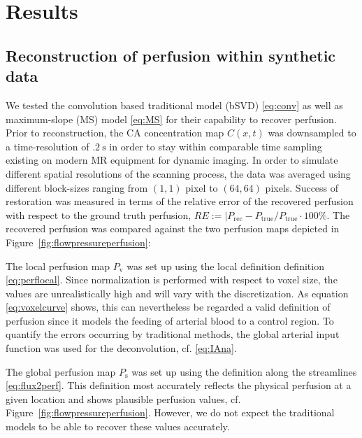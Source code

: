 \documentclass[journal,twocolumn]{IEEEtran}
\newcommand{\Perf}{P}
\newcommand{\Perfv}{P_{\mathrm{v}}}
\newcommand{\Perfs}{P_{\mathrm{s}}}
\begin{document}
	\section{Results}	
	\subsection{Reconstruction of perfusion within synthetic data}\label{sec:RecPhantom}


	We tested the convolution based traditional model (bSVD) \eqref{eq:conv} as well as maximum-slope (MS) model \eqref{eq:MS} for their capability to recover perfusion.
	Prior to reconstruction, the CA concentration map $C(x,t)$ was downsampled to a time-resolution of $\SI{.2}{\second}$ in order to stay within comparable time sampling existing on modern MR equipment for dynamic imaging.
	In order to simulate different spatial resolutions of the scanning process, the data was averaged using different block-sizes ranging from $(1,1)$ pixel to $(64,64)$ pixels.		
	Success of restoration was measured in terms of the relative error of the recovered perfusion with respect to the ground truth perfusion, $RE := \vert \Perf_{\mathrm{rec}} - \Perf_{\mathrm{true}}/\Perf_{\mathrm{true}}\cdot 100\%$.
	The recovered perfusion was compared against the two perfusion maps depicted in Figure~\ref{fig:flowpressureperfusion}:
	
	The local perfusion map $\Perfv$ was set up using the local definition definition \eqref{eq:perflocal}. 
	Since normalization is performed with respect to voxel size, the values are unrealistically high and will vary with the discretization.
	As equation \eqref{eq:voxelcurve} shows, this can nevertheless be regarded a valid definition of perfusion since it models the feeding of arterial blood to a control region.
	To quantify the errors occurring by traditional methods, the global arterial input function was used for the deconvolution, cf. \eqref{eq:IAna}.

	The global perfusion map $\Perfs$ was set up using the definition along the streamlines \eqref{eq:flux2perf}.
	This definition most accurately reflects the physical perfusion at a given location and shows plausible perfusion values, cf. Figure~\ref{fig:flowpressureperfusion}.
	However, we do not expect the traditional models to be able to recover these values accurately.
	
\end{document}
